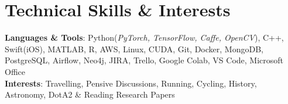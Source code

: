 \documentclass[letterpaper,11pt]{article}
\begin{document}
%
\section{Technical Skills \& Interests}
 \begin{itemize}[leftmargin=0.15in, label={}]
    \small{\item{
     \textbf{Languages \& Tools}{: Python(\textit{PyTorch, TensorFlow, Caffe, OpenCV}), C++, Swift(iOS), MATLAB, R, AWS, Linux, CUDA, Git, Docker, MongoDB, PostgreSQL, Airflow, Neo4j, JIRA, Trello, Google Colab, VS Code, Microsoft Office}} \\
     \textbf{Interests}{: Travelling, Pensive Discussions, Running, Cycling, History, Astronomy,  DotA2 \& Reading Research Papers}
     }
 \end{itemize}


\end{document}
